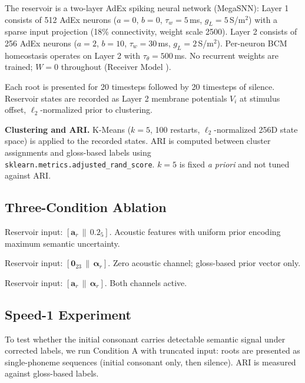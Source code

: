 \documentclass{article}
\begin{document}
The reservoir is a two-layer AdEx spiking neural network (MegaSNN):
Layer 1 consists of 512 AdEx neurons ($a = 0$, $b = 0$, $\tau_w = 5$\,ms,
$g_L = 5$\,S/m$^2$) with a sparse input projection (18\% connectivity,
weight scale 2500). Layer 2 consists of 256 AdEx neurons ($a = 2$,
$b = 10$, $\tau_w = 30$\,ms, $g_L = 2$\,S/m$^2$). Per-neuron BCM
homeostasis operates on Layer 2 with $\tau_\theta = 500$\,ms. No
recurrent weights are trained; $W = 0$ throughout (Receiver Model
\citep{kumar2026ddin}).

Each root is presented for 20 timesteps followed by 20 timesteps of
silence. Reservoir states are recorded as Layer 2 membrane potentials
$V_i$ at stimulus offset, $\ell_2$-normalized prior to clustering.

\textbf{Clustering and ARI.} K-Means ($k = 5$, 100 restarts,
$\ell_2$-normalized 256D state space) is applied to the recorded states.
ARI is computed between cluster assignments and gloss-based labels using
\texttt{sklearn.metrics.adjusted\_rand\_score}. $k = 5$ is fixed
\textit{a priori} and not tuned against ARI.

\subsection{Three-Condition Ablation}

\begin{description}[noitemsep]
  \item[Condition A (Acoustic-only).] Reservoir input:
    $[\mathbf{a}_r \,\|\, \mathbf{0.2}_{5}]$. Acoustic features with
    uniform prior encoding maximum semantic uncertainty.
  \item[Condition B (Prior-only).] Reservoir input:
    $[\mathbf{0}_{23} \,\|\, \boldsymbol{\alpha}_r]$. Zero acoustic
    channel; gloss-based prior vector only.
  \item[Condition C (Full fusion).] Reservoir input:
    $[\mathbf{a}_r \,\|\, \boldsymbol{\alpha}_r]$. Both channels active.
\end{description}

\subsection{Speed-1 Experiment}

To test whether the initial consonant carries detectable semantic signal
under corrected labels, we run Condition A with truncated input: roots
are presented as single-phoneme sequences (initial consonant only, then
silence). ARI is measured against gloss-based labels.
\end{document}
